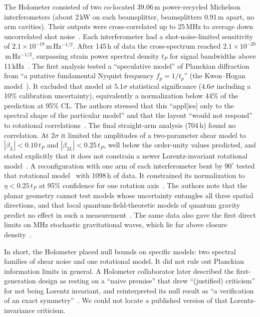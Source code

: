 The Holometer consisted of two co-located 39.06\,m power-recycled Michelson
interferometers (about 2\,kW on each beamsplitter, beamsplitters 0.91\,m apart,
no arm cavities). Their outputs were cross-correlated up to 25\,MHz to average
down uncorrelated shot noise~\cite{Chou2016first,Holometer2017holometer}.
Each interferometer had a shot-noise-limited sensitivity of
$2.1\times10^{-18}$\,m\,Hz$^{-1/2}$. After 145\,h of data the cross-spectrum
reached $2.1\times10^{-20}$\,m\,Hz$^{-1/2}$, surpassing strain power spectral
density $t_P$ for signal bandwidths above 11\,kHz~\cite{Chou2016first}.
The first analysis tested a ``speculative model'' of Planckian diffraction
from ``a putative fundamental Nyquist frequency $f_p=1/t_p$'' (the Kwon--Hogan
model~\cite{Kwon2016interferometric}). It excluded that model at $5.1\sigma$
statistical significance ($4.6\sigma$ including a 10\% calibration uncertainty),
equivalently a normalization below 44\% of the prediction at 95\% CL. The authors
stressed that this ``appl[ies] only to the spectral shape of the particular model''
and that the layout ``would not respond'' to rotational
correlations~\cite{Chou2016first}. The final straight-arm analysis (704\,h)
found no correlation. At $2\sigma$ it limited the amplitudes of a two-parameter
shear model to $|\beta_L|<0.10\,t_P$ and $|\beta_{2L}|<0.25\,t_P$, well below
the order-unity values predicted, and stated explicitly that it does not
constrain a newer Lorentz-invariant rotational model~\cite{Chou2017interferometric}.
A reconfiguration with one arm of each interferometer bent by $90^\circ$ tested
that rotational model~\cite{Hogan2017statistical} with 1098\,h of data. It
constrained its normalization to $\eta<0.25\,t_P$ at 95\% confidence for one
rotation axis~\cite{Richardson2021interferometric}. The authors note that the
planar geometry cannot test models whose uncertainty entangles all three spatial
directions, and that local quantum-field-theoretic models of quantum gravity
predict no effect in such a measurement~\cite{Richardson2021interferometric}.
The same data also gave the first direct limits on MHz stochastic gravitational
waves, which lie far above closure density~\cite{Holometer2017mhz}.

In short, the Holometer placed null bounds on specific models: two spectral
families of shear noise and one rotational model. It did not rule out Planckian
information limits in general. A Holometer collaborator later described the
first-generation design as resting on a ``naive premise'' that drew ``(justified)
criticism'' for not being Lorentz invariant, and reinterpreted its null result
as ``a verification of an exact symmetry''~\cite{Kwon2025phenomenology}. We could
not locate a published version of that Lorentz-invariance criticism.

